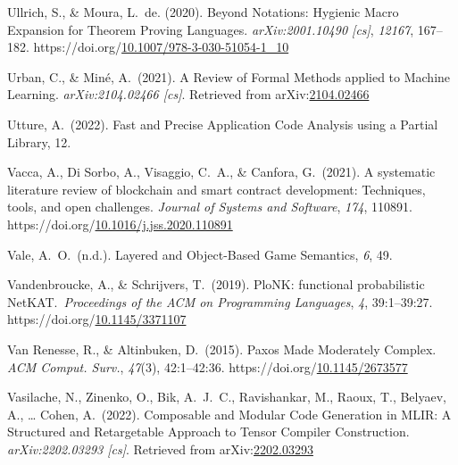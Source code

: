 \documentclass[12pt,twoside]{article}
\begin{document}
{\begin{thebibliography}{1079}
\mdbibitemlabel{}Ullrich, S., \& Moura, L.~de. (2020). Beyond Notations: Hygienic Macro Expansion for Theorem Proving Languages. \emph{arXiv:2001.10490 {}[cs]}, \emph{12167}, 167–182. https://doi.org/\href{https://dx.doi.org/10.1007/978-3-030-51054-1_10}{10.1007/978-3-030-51054-1\_10}%

\mdbibitemlabel{}Urban, C., \& Miné, A.~(2021). A Review of Formal Methods applied to Machine Learning. \emph{arXiv:2104.02466 {}[cs]}. Retrieved from arXiv:\href{http://arxiv.org/abs/2104.02466}{2104.02466}%

\mdbibitemlabel{}Utture, A.~(2022). Fast and Precise Application Code Analysis using a Partial Library, 12.%

\mdbibitemlabel{}Vacca, A., Di Sorbo, A., Visaggio, C.~A., \& Canfora, G.~(2021). A systematic literature review of blockchain and smart contract development: Techniques, tools, and open challenges. \emph{Journal of Systems and Software}, \emph{174}, 110891. https://doi.org/\href{https://dx.doi.org/10.1016/j.jss.2020.110891}{10.1016/j.jss.2020.110891}%

\mdbibitemlabel{}Vale, A.~O.~(n.d.). Layered and Object-Based Game Semantics, \emph{6}, 49.%

\mdbibitemlabel{}Vandenbroucke, A., \& Schrijvers, T.~(2019). PloNK: functional probabilistic NetKAT.~\emph{Proceedings of the ACM on Programming Languages}, \emph{4}, 39:1–39:27. https://doi.org/\href{https://dx.doi.org/10.1145/3371107}{10.1145/3371107}%

\mdbibitemlabel{}Van Renesse, R., \& Altinbuken, D.~(2015). Paxos Made Moderately Complex. \emph{ACM Comput. Surv.}, \emph{47}(3), 42:1–42:36. https://doi.org/\href{https://dx.doi.org/10.1145/2673577}{10.1145/2673577}%

\mdbibitemlabel{}Vasilache, N., Zinenko, O., Bik, A.~J.~C., Ravishankar, M., Raoux, T., Belyaev, A., … Cohen, A.~(2022). Composable and Modular Code Generation in MLIR: A Structured and Retargetable Approach to Tensor Compiler Construction. \emph{arXiv:2202.03293 {}[cs]}. Retrieved from arXiv:\href{http://arxiv.org/abs/2202.03293}{2202.03293}%


\end{thebibliography}}
\end{document}
